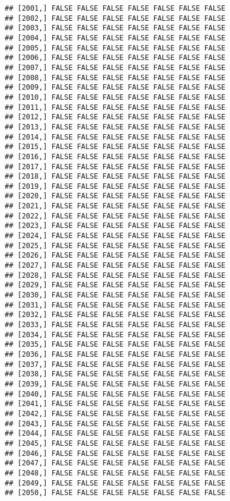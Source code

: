 \documentclass[
]{article}
\begin{document}
\begin{verbatim}
## [2001,] FALSE FALSE FALSE FALSE FALSE FALSE FALSE
## [2002,] FALSE FALSE FALSE FALSE FALSE FALSE FALSE
## [2003,] FALSE FALSE FALSE FALSE FALSE FALSE FALSE
## [2004,] FALSE FALSE FALSE FALSE FALSE FALSE FALSE
## [2005,] FALSE FALSE FALSE FALSE FALSE FALSE FALSE
## [2006,] FALSE FALSE FALSE FALSE FALSE FALSE FALSE
## [2007,] FALSE FALSE FALSE FALSE FALSE FALSE FALSE
## [2008,] FALSE FALSE FALSE FALSE FALSE FALSE FALSE
## [2009,] FALSE FALSE FALSE FALSE FALSE FALSE FALSE
## [2010,] FALSE FALSE FALSE FALSE FALSE FALSE FALSE
## [2011,] FALSE FALSE FALSE FALSE FALSE FALSE FALSE
## [2012,] FALSE FALSE FALSE FALSE FALSE FALSE FALSE
## [2013,] FALSE FALSE FALSE FALSE FALSE FALSE FALSE
## [2014,] FALSE FALSE FALSE FALSE FALSE FALSE FALSE
## [2015,] FALSE FALSE FALSE FALSE FALSE FALSE FALSE
## [2016,] FALSE FALSE FALSE FALSE FALSE FALSE FALSE
## [2017,] FALSE FALSE FALSE FALSE FALSE FALSE FALSE
## [2018,] FALSE FALSE FALSE FALSE FALSE FALSE FALSE
## [2019,] FALSE FALSE FALSE FALSE FALSE FALSE FALSE
## [2020,] FALSE FALSE FALSE FALSE FALSE FALSE FALSE
## [2021,] FALSE FALSE FALSE FALSE FALSE FALSE FALSE
## [2022,] FALSE FALSE FALSE FALSE FALSE FALSE FALSE
## [2023,] FALSE FALSE FALSE FALSE FALSE FALSE FALSE
## [2024,] FALSE FALSE FALSE FALSE FALSE FALSE FALSE
## [2025,] FALSE FALSE FALSE FALSE FALSE FALSE FALSE
## [2026,] FALSE FALSE FALSE FALSE FALSE FALSE FALSE
## [2027,] FALSE FALSE FALSE FALSE FALSE FALSE FALSE
## [2028,] FALSE FALSE FALSE FALSE FALSE FALSE FALSE
## [2029,] FALSE FALSE FALSE FALSE FALSE FALSE FALSE
## [2030,] FALSE FALSE FALSE FALSE FALSE FALSE FALSE
## [2031,] FALSE FALSE FALSE FALSE FALSE FALSE FALSE
## [2032,] FALSE FALSE FALSE FALSE FALSE FALSE FALSE
## [2033,] FALSE FALSE FALSE FALSE FALSE FALSE FALSE
## [2034,] FALSE FALSE FALSE FALSE FALSE FALSE FALSE
## [2035,] FALSE FALSE FALSE FALSE FALSE FALSE FALSE
## [2036,] FALSE FALSE FALSE FALSE FALSE FALSE FALSE
## [2037,] FALSE FALSE FALSE FALSE FALSE FALSE FALSE
## [2038,] FALSE FALSE FALSE FALSE FALSE FALSE FALSE
## [2039,] FALSE FALSE FALSE FALSE FALSE FALSE FALSE
## [2040,] FALSE FALSE FALSE FALSE FALSE FALSE FALSE
## [2041,] FALSE FALSE FALSE FALSE FALSE FALSE FALSE
## [2042,] FALSE FALSE FALSE FALSE FALSE FALSE FALSE
## [2043,] FALSE FALSE FALSE FALSE FALSE FALSE FALSE
## [2044,] FALSE FALSE FALSE FALSE FALSE FALSE FALSE
## [2045,] FALSE FALSE FALSE FALSE FALSE FALSE FALSE
## [2046,] FALSE FALSE FALSE FALSE FALSE FALSE FALSE
## [2047,] FALSE FALSE FALSE FALSE FALSE FALSE FALSE
## [2048,] FALSE FALSE FALSE FALSE FALSE FALSE FALSE
## [2049,] FALSE FALSE FALSE FALSE FALSE FALSE FALSE
## [2050,] FALSE FALSE FALSE FALSE FALSE FALSE FALSE

\end{verbatim}
\end{document}
